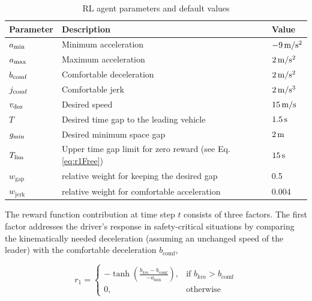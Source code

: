 \documentclass[review]{elsarticle}
\providecommand{\sub}[1]{_{\mathrm{#1}}}  %
\providecommand{\3}{{\ss}}
\begin{document}
\begin{table}
	\caption{RL agent parameters and default values} 
	\label{tab:agentParameters} 
	\begin{center}
		\begin{tabular}{ p{}| p{}| p{}}
			Parameter & Description & Value \\ \hline
			$a\sub{\rm min}$ & Minimum acceleration & $\unit[-9]{m/s^2}$ \\  
			$a_{\rm max}$ & Maximum acceleration & $\unit[2]{m/s^2}$ \\  
			$b_{\rm comf}$ & Comfortable deceleration & $\unit[2]{m/s^2}$ \\  
			$j_{\rm comf}$ & Comfortable jerk & $\unit[2]{m/s^3}$ \\  
			$v_{\rm des}$ & Desired speed & $\unit[15]{ m/s}$ \\  		
			$T$ & Desired time gap to the leading vehicle & $\unit[1.5]{s}$ \\
			$g_{\rm min}$ & Desired minimum space gap & $\unit[2]{m}$ \\
			$T_{\rm lim}$ & Upper time gap limit for zero reward (see
			Eq. \eqref{eq:r1Free}) & $\unit[15]{s}$ \\
			$w\sub{gap}$ & relative weight for keeping the desired gap & 0.5\\
			$w\sub{jerk}$ & relative weight for comfortable acceleration & 0.004\\
		\end{tabular}
	\end{center}
\end{table}



The reward function contribution at time step $t$ consists of three factors. 
The first factor addresses the driver's
response in safety-critical situations by comparing the
kinematically needed deceleration (assuming an
unchanged speed of the leader) with the
comfortable deceleration $b\sub{comf}$,



\begin{equation}
\label{eq:r1_CFP}
r_1 = 
\begin{cases}
-\tanh\left(\frac{b_{kin}-b\sub{comf}}{-a\sub{min}}\right),& \text{if } b_{kin}>b\sub{comf}\\
0,              & \text{otherwise}
\end{cases}
\end{equation}
\end{document}

